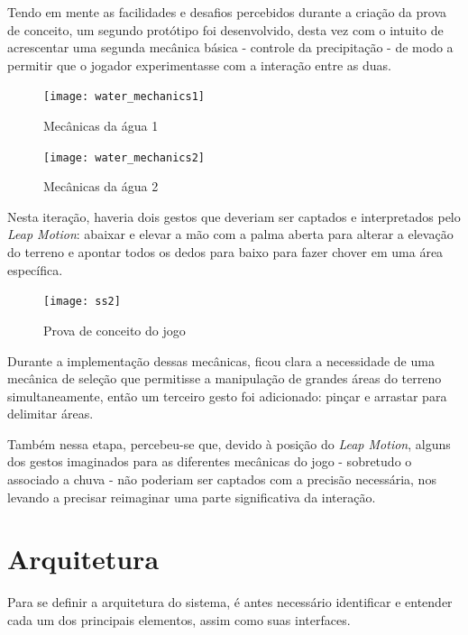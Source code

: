Tendo em mente as facilidades e desafios percebidos durante a criação da prova de conceito, um segundo protótipo foi desenvolvido, desta vez com o intuito de acrescentar uma segunda mecânica básica - controle da precipitação - de modo a permitir que o jogador experimentasse com a interação entre as duas.

\begin{figure}[ht]
	\centering
	\caption{Mecânicas da água 1}
	\texttt{[image: water\_mechanics1]}
	\legend{\fonteAP}
\end{figure}

\begin{figure}[ht]
	\centering
	\caption{Mecânicas da água 2}
	\texttt{[image: water\_mechanics2]}
	\legend{\fonteAP}
\end{figure}

Nesta iteração, haveria dois gestos que deveriam ser captados e interpretados pelo \textit{Leap Motion}: abaixar e elevar a mão com a palma aberta para alterar a elevação do terreno e apontar todos os dedos para baixo para fazer chover em uma área específica.

\begin{figure}[ht]
	\centering
	\caption{Prova de conceito do jogo}
	\texttt{[image: ss2]}
	\legend{\fonteAP}
\end{figure}

Durante a implementação dessas mecânicas, ficou clara a necessidade de uma mecânica de seleção que permitisse a manipulação de grandes áreas do terreno simultaneamente, então um terceiro gesto foi adicionado: pinçar e arrastar para delimitar áreas.

Também nessa etapa, percebeu-se que, devido à posição do \textit{Leap Motion}, alguns dos gestos imaginados para as diferentes mecânicas do jogo - sobretudo o associado a chuva - não poderiam ser captados com a precisão necessária, nos levando a precisar reimaginar uma parte significativa da interação.



\section{Arquitetura}\label{sec-desenvolvimento-arquitetura}

Para se definir a arquitetura do sistema, é antes necessário identificar e entender cada um dos principais elementos, assim como suas interfaces.

